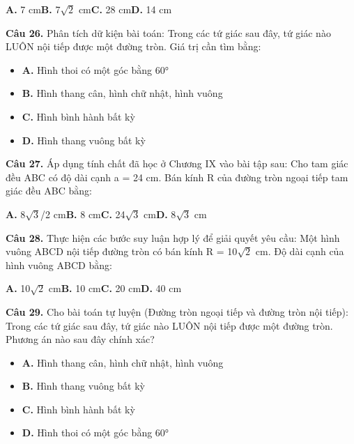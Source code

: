 \documentclass[11pt,a4paper]{article}
\begin{document}
\hspace*{1.5em}\textbf{A.} 7 cm\quad\quad \textbf{B.} 7$\sqrt{2}$ cm\quad\quad \textbf{C.} 28 cm\quad\quad \textbf{D.} 14 cm\par\vspace{2pt}
\textbf{\color{primary} Câu 26.} Phân tích dữ kiện bài toán: Trong các tứ giác sau đây, tứ giác nào LUÔN nội tiếp được một đường tròn. Giá trị cần tìm bằng:\par
\begin{itemize}\setlength{\itemsep}{1pt}\setlength{\parskip}{0pt}
  \item[] \textbf{A.} Hình thoi có một góc bằng 60°
  \item[] \textbf{B.} Hình thang cân, hình chữ nhật, hình vuông
  \item[] \textbf{C.} Hình bình hành bất kỳ
  \item[] \textbf{D.} Hình thang vuông bất kỳ
\end{itemize}\vspace{2pt}
\textbf{\color{primary} Câu 27.} Áp dụng tính chất đã học ở Chương IX vào bài tập sau: Cho tam giác đều ABC có độ dài cạnh a = 24 cm. Bán kính R của đường tròn ngoại tiếp tam giác đều ABC bằng:\par
\hspace*{1.5em}\textbf{A.} 8$\sqrt{3}$/2 cm\quad\quad \textbf{B.} 8 cm\quad\quad \textbf{C.} 24$\sqrt{3}$ cm\quad\quad \textbf{D.} 8$\sqrt{3}$ cm\par\vspace{2pt}
\textbf{\color{primary} Câu 28.} Thực hiện các bước suy luận hợp lý để giải quyết yêu cầu: Một hình vuông ABCD nội tiếp đường tròn có bán kính R = 10$\sqrt{2}$ cm. Độ dài cạnh của hình vuông ABCD bằng:\par
\hspace*{1.5em}\textbf{A.} 10$\sqrt{2}$ cm\quad\quad \textbf{B.} 10 cm\quad\quad \textbf{C.} 20 cm\quad\quad \textbf{D.} 40 cm\par\vspace{2pt}
\textbf{\color{primary} Câu 29.} Cho bài toán tự luyện (Đường tròn ngoại tiếp và đường tròn nội tiếp): Trong các tứ giác sau đây, tứ giác nào LUÔN nội tiếp được một đường tròn. Phương án nào sau đây chính xác?\par
\begin{itemize}\setlength{\itemsep}{1pt}\setlength{\parskip}{0pt}
  \item[] \textbf{A.} Hình thang cân, hình chữ nhật, hình vuông
  \item[] \textbf{B.} Hình thang vuông bất kỳ
  \item[] \textbf{C.} Hình bình hành bất kỳ
  \item[] \textbf{D.} Hình thoi có một góc bằng 60°
\end{itemize}\vspace{2pt}
\end{document}
